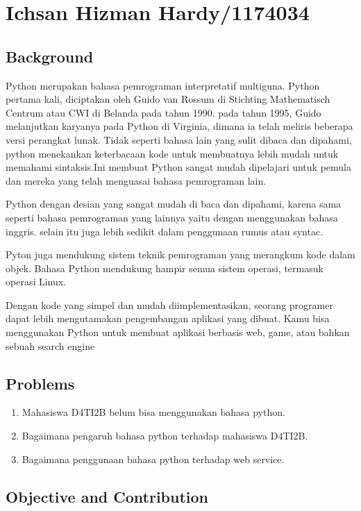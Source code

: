 \section{Ichsan Hizman Hardy/1174034}
\subsection{Background}
\par
Python merupakan bahasa pemrograman interpretatif multiguna. Python pertama kali, diciptakan oleh Guido van Rossum di Stichting Mathematisch Centrum atau CWI di Belanda pada tahun 1990. pada tahun 1995, Guido melanjutkan karyanya pada Python di Virginia, dimana ia telah meliris beberapa versi perangkat lunak\cite{priyahita2015analisis}.
Tidak seperti bahasa lain yang sulit dibaca dan dipahami, python menekankan keterbacaan kode untuk membuatnya lebih mudah untuk memahami sintaksis\cite{cokelaer2013bioservices}.Ini membuat Python sangat mudah dipelajari untuk pemula dan mereka yang telah menguasai bahasa pemrograman lain.
\par
Python dengan desian yang sangat mudah di baca dan dipahami, karena sama seperti bahasa pemrograman yang lainnya yaitu dengan menggunakan bahasa inggris. selain itu juga lebih sedikit dalam penggunaan rumus atau syntac\cite{nur2018prototipe}.
\par
Pyton juga mendukung sistem teknik pemrograman yang merangkum kode dalam objek. Bahasa Python  mendukung hampir  semua sistem operasi, termasuk operasi Linux\cite{muzawi2018penerapan}.
\par
Dengan kode yang simpel dan mudah diimplementasikan, seorang programer dapat lebih mengutamakan pengembangan aplikasi yang dibuat. Kamu bisa menggunakan Python untuk membuat aplikasi berbasis web, game, atau bahkan sebuah search engine
	
\subsection{Problems}
\begin{enumerate}
	\item Mahasiswa D4TI2B belum bisa menggunakan bahasa python.
	\item Bagaimana pengaruh bahasa python terhadap mahasiswa D4TI2B.
	\item Bagaimana penggunaan bahasa python terhadap web service.
\end{enumerate}
	
\subsection{Objective and Contribution}
